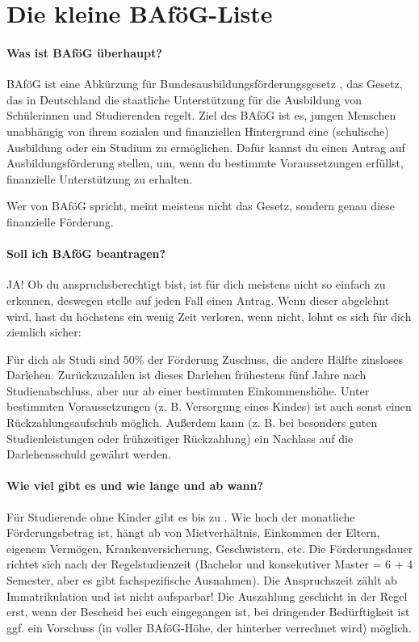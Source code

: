 \section{Die kleine BAföG-Liste}

\paragraph{Was ist BAföG überhaupt?}
BAföG ist eine Abkürzung für \glqq Bundesausbildungsförderungsgesetz \grqq, das Gesetz, das in Deutschland die staatliche Unterstützung für die Ausbildung von Schülerinnen und Studierenden regelt. Ziel des BAföG ist es, jungen Menschen unabhängig von ihrem sozialen und finanziellen Hintergrund eine (schulische) Ausbildung oder ein Studium zu ermöglichen. Dafür kannst du einen \glqq Antrag auf Ausbildungsförderung \grqq stellen, um, wenn du bestimmte Voraussetzungen erfüllst, finanzielle Unterstützung zu erhalten. 

Wer von BAföG spricht, meint meistens nicht das Gesetz, sondern genau diese finanzielle Förderung.

\paragraph{Soll ich BAföG beantragen?}
JA! Ob du anspruchsberechtigt bist, ist für dich meistens nicht so einfach zu erkennen, deswegen stelle auf jeden Fall einen Antrag. Wenn dieser abgelehnt wird, hast du höchstens ein wenig Zeit verloren, wenn nicht, lohnt es sich für dich ziemlich sicher:

Für dich als Studi sind 50\% der Förderung Zuschuss, die andere Hälfte zinsloses Darlehen. Zurückzuzahlen ist dieses Darlehen frühestens fünf Jahre nach Studienabschluss, aber nur ab einer bestimmten Einkommenshöhe. Unter bestimmten Voraussetzungen (z. B. Versorgung eines Kindes) ist auch sonst einen Rückzahlungsaufschub möglich. Außerdem kann (z. B. bei besonders guten Studienleistungen oder frühzeitiger Rückzahlung) ein Nachlass auf die Darlehensschuld gewährt werden.

\paragraph{Wie viel gibt es und wie lange und ab wann?}
Für Studierende ohne Kinder gibt es bis zu . Wie hoch der monatliche Förderungsbetrag ist, hängt ab von Mietverhältnis, Einkommen der Eltern, eigenem Vermögen, Krankenversicherung, Geschwistern, etc. Die Förderungsdauer richtet sich nach der Regelstudienzeit (Bachelor und konsekutiver Master = 6 + 4 Semester, aber es gibt fachspezifische Ausnahmen). Die Anspruchszeit zählt ab Immatrikulation und ist nicht aufsparbar! Die Auszahlung geschieht in der Regel erst, wenn der Bescheid bei euch eingegangen ist, bei dringender Bedürftigkeit ist ggf. ein Vorschuss (in voller BAföG-Höhe, der hinterher verrechnet wird) möglich.

